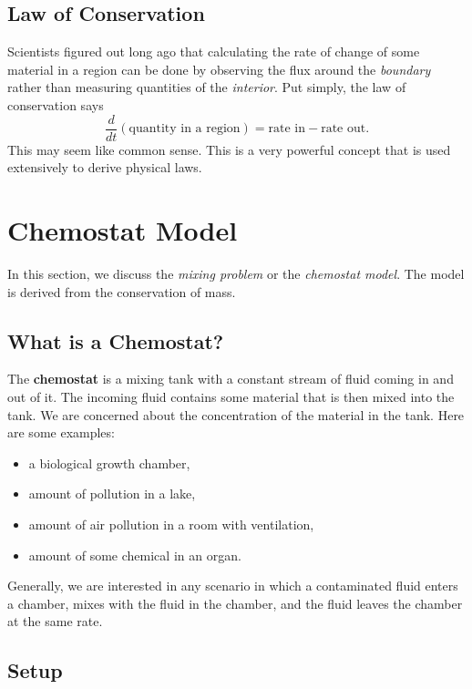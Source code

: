 \documentclass[09pt,letterpaper]{article}
\begin{document}
\subsection{Law of Conservation}
Scientists figured out long ago that calculating the rate of change of some material in a region can be done by observing the flux around the \textit{boundary} rather than measuring quantities of the \textit{interior}. Put simply, the law of conservation says
$$
\frac{d}{dt}(\text{quantity in a region}) = \text{rate in} - \text{rate out}. 
$$
This may seem like common sense. This is a very powerful concept that is used extensively to derive physical laws. 


\section{Chemostat Model}

In this section, we discuss the \textit{mixing problem} or the \textit{chemostat model}. The model is derived from the conservation of mass.

\subsection{What is a Chemostat?}

The \textbf{chemostat} is a mixing tank with a constant stream of fluid coming in and out of it. The incoming fluid contains some material that is then mixed into the tank. We are concerned about the concentration of the material in the tank. Here are some examples: 
\begin{itemize}
    \item a biological growth chamber,
    \item amount of pollution in a lake,
    \item amount of air pollution in a room with ventilation, 
    \item amount of some chemical in an organ.
\end{itemize}
Generally, we are interested in any scenario in which a contaminated fluid enters a chamber, mixes with the fluid in the chamber, and the fluid leaves the chamber at the same rate.

\subsection{Setup}
\end{document}
